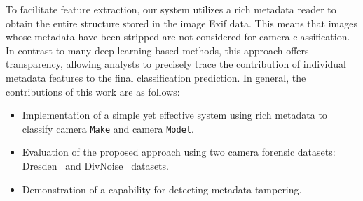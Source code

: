 To facilitate feature extraction, our system utilizes a rich metadata reader to obtain the entire structure stored in the image Exif data. This means that images whose metadata have been stripped are not considered for camera classification. In contrast to many deep learning based methods, this approach offers transparency, allowing analysts to precisely trace the contribution of individual metadata features to the final classification prediction. In general, the contributions of this work are as follows:
\begin{itemize}
    \item Implementation of a simple yet effective system using rich metadata to classify camera \texttt{Make} and camera \texttt{Model}.
    \item Evaluation of the proposed approach using two camera forensic datasets: Dresden~\cite{gloe2010dresden} and DivNoise~\cite{casagrande2023divnoise} datasets.
    \item Demonstration of a capability for detecting metadata tampering.
\end{itemize}
